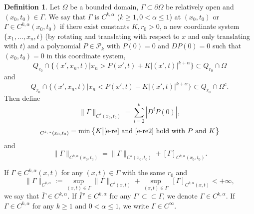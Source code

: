 \documentclass[preprint,12pt]{elsarticle}
\theoremstyle{definition}
\newtheorem{definition}[theorem]{Definition}
\theoremstyle{remark}
\numberwithin{equation}{section}
\begin{document}
\begin{definition}\label{d-domain}
Let $\Omega$ be a bounded domain, $\Gamma\subset \partial \Omega$ be relatively open and $(x_0,t_0)\in \Gamma$. We say that $\Gamma$ is $C^{k,\alpha}$ ($k\geq 1, 0<\alpha\leq 1$) at $(x_0,t_0)$ or $\Gamma\in C^{k,\alpha}(x_0,t_0)$ if there exist constants $K,r_0>0$, a new coordinate system $\{x_1,...,x_n,t \}$ (by rotating and translating with respect to $x$ and only translating with $t$) and a polynomial $P\in \mathcal{P}_k$ with $P(0)=0$ and $DP(0)=0$ such that $(x_0,t_0)=0$ in this coordinate system,
\begin{equation}\label{e-re}
Q_{r_0} \cap \{(x',x_n,t)\big |x_n>P(x',t)+K|(x',t)|^{k+\alpha}\} \subset Q_{r_0}\cap \Omega
\end{equation}
and
\begin{equation}\label{e-re2}
Q_{r_0} \cap \{(x',x_n,t)\big |x_n<P(x',t)-K|(x',t)|^{k+\alpha}\} \subset Q_{r_0}\cap \Omega^c.
\end{equation}
Then define
\begin{equation*}
  \|\Gamma\|_{C^{k}(x_0,t_0)}=\sum_{i=2}^{k}|D^iP(0)|,
\end{equation*}
\begin{equation*}
[\Gamma]_{C^{k,\alpha}(x_0,t_0)}=\min \left\{K\big | \cref{e-re} ~\mbox{and}~ \cref{e-re2}~\mbox{hold with}~P~\mbox{and}~K\right\}
\end{equation*}
and
\begin{equation*}
\|\Gamma\|_{C^{k,\alpha}(x_0,t_0)}=\|\Gamma\|_{C^{k}(x_0,t_0)}+[\Gamma]_{C^{k,\alpha}(x_0,t_0)}.
\end{equation*}

If $\Gamma\in C^{k, \alpha}(x,t)$ for any $(x,t)\in \Gamma$ with the same $r_0$ and
\begin{equation*}
  \|\Gamma\|_{C^{k,\alpha}}:= \sup_{(x,t)\in \Gamma} \|\Gamma\|_{C^{k}(x,t)}+\sup_{(x,t)\in \Gamma}~[\Gamma]_{C^{k, \alpha}(x,t)}<+\infty,
\end{equation*}
we say that $\bar\Gamma\in C^{k,\alpha}$. If $\bar\Gamma'\in C^{k,\alpha}$ for any $\Gamma'\subset\subset\Gamma$, we denote $\Gamma\in C^{k,\alpha}$. If $\Gamma\in C^{k,\alpha}$ for any $k\geq1$ and $0<\alpha\leq 1$, we write $\Gamma\in C^{\infty}$.
\end{definition}
\end{document}
